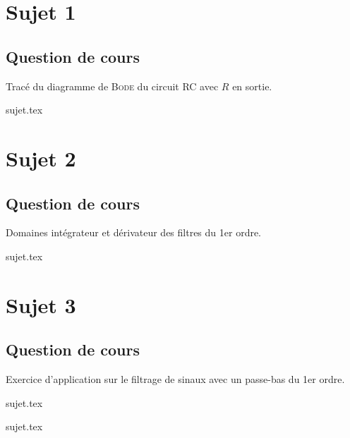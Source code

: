 \documentclass[a4paper, 11pt]{book}
\begin{document}
\resetQ
\newpage

\chapter{Sujet 1}
\section{Question de cours}
Tracé du diagramme de \textsc{Bode} du circuit RC avec $R$ en sortie.

{sujet.tex}

\resetQ
\newpage

\chapter{Sujet 2}
\section{Question de cours}
Domaines intégrateur et dérivateur des filtres du 1er ordre.

{sujet.tex}

\resetQ
\newpage

\chapter{Sujet 3}
\section{Question de cours}
Exercice d'application sur le filtrage de sinaux avec un passe-bas du 1er ordre.

{sujet.tex}

\resetQ
{sujet.tex}
\end{document}
